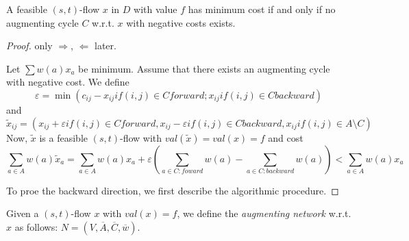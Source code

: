 \begin{thm}
A feasible $(s,t)$-flow $x$ in $D$ with value $f$ has minimum cost if and
only if no augmenting cycle $C$ w.r.t. $x$ with negative costs exists.
\end{thm}
\begin{proof}
only $\Rightarrow$, $\Leftarrow$ later.

Let $\sum w(a) x_a$ be minimum. Assume that there exists an augmenting cycle
with negative cost. We define
\[
	\varepsilon = \min ( c_{ij} - x_{ij} if (i,j) \in C forward ; x_{ij} if
	(i,j) \in C backward )
\]
and 
\[
	\tilde{x}_{ij} = ( x_{ij} + \varepsilon if (i,j) \in C forward, 
	x_{ij} - \varepsilon if (i,j) \in C backward,
	x_{ij} if (i,j) \in A \setminus C
	)
\]
Now, $\tilde{x}$ is a feasible $(s,t)$-flow with $val(\tilde{x}) = val(x) =
f$ and cost
\[
	\sum_{a \in A} w(a) \tilde{x}_a = \sum_{a \in A} w(a) x_a + \varepsilon
	\left( \sum_{a \in C: foward} w(a) - \sum_{a \in C: backward} w(a) \right)
	< \sum_{a \in A} w(a) x_a
\]

To proe the backward direction, we first describe the algorithmic procedure.
\end{proof}

\begin{defn}
Given a $(s,t)$-flow $x$ with $val(x) = f$, we define the \emph{augmenting
network} w.r.t. $x$ as follows: $N = (V, \overline{A}, \overline{C},
\overline{w})$.
\end{defn}